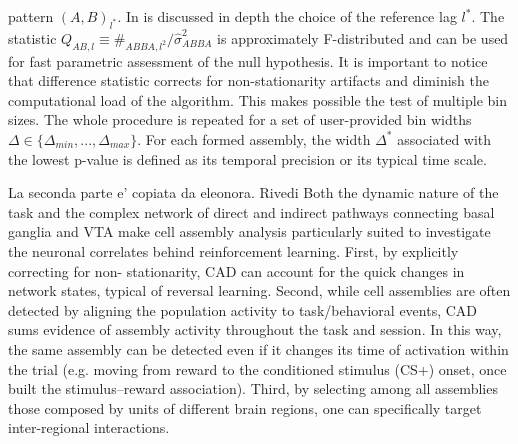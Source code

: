 pattern $(A,B)_{l^*}$. In \cite{RussoDurstewitz} is discussed in depth the choice of the reference lag $l^*$.
The statistic $Q_{AB,l}\equiv \#_{ABBA,l^2}/\hat{\sigma}_{ABBA}^2$ is approximately F-distributed and can be used for fast parametric assessment of the null hypothesis. It is important to notice that difference statistic corrects for non-stationarity artifacts and diminish the computational load of the algorithm. This makes possible the test of multiple bin sizes. The whole procedure is repeated for a set of user-provided bin widths $\Delta \in \{\Delta_{min},...,\Delta_{max}\}$. For each formed assembly, the width $\Delta^*$ associated with the lowest p-value is defined as its temporal precision or its typical time scale.

{\color{red} La seconda parte e' copiata da eleonora. Rivedi}
Both the dynamic nature of the task and the complex network of direct and indirect pathways
connecting basal ganglia and VTA make cell assembly analysis particularly suited to investigate
the neuronal correlates behind reinforcement learning. First, by explicitly correcting for non-
stationarity, CAD can account for the quick changes in network states, typical of reversal
learning. Second, while cell assemblies are often detected by aligning the population activity to
task/behavioral events, CAD sums evidence of assembly activity throughout the task and
session. In this way, the same assembly can be detected even if it changes its time of activation
within the trial (e.g. moving from reward to the conditioned stimulus (CS+) onset, once built the
stimulus–reward association). Third, by selecting among all assemblies those composed by
units of different brain regions, one can specifically target inter-regional interactions.

